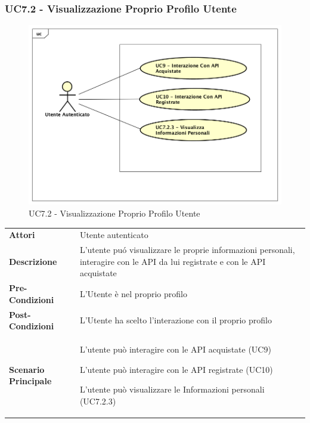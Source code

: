 \newpage
\subsubsection{UC7.2 - Visualizzazione Proprio Profilo Utente}
\label{UC7.2}

\begin{figure}[ht]
	\centering
	\includegraphics[scale=0.45]{UML/UC7_2.png}
	\caption{UC7.2 - Visualizzazione Proprio Profilo Utente}
\end{figure}
\FloatBarrier
\begin{longtable}{ l | p{11cm}}
	\hline
	\rowcolor{Gray}
	 \multicolumn{2}{c}{UC7.2 - Visualizzazione Proprio Profilo Utente} \\
	 \hline
	 \textbf{Attori} & Utente autenticato \\
	\textbf{Descrizione} & L’utente pu\'{o} visualizzare le proprie informazioni personali, interagire con le API da lui registrate e con le API acquistate  \\
	\textbf{Pre-Condizioni} & L’Utente \`{e} nel proprio profilo \\
	\textbf{Post-Condizioni} & L’Utente ha scelto l'interazione con il proprio profilo \\
	\textbf{Scenario Principale} & 
	\begin{enumerate*}[label=(\arabic*.),itemjoin={\newline}]
		\item L'utente pu\`{o} interagire con le API acquistate (UC9)
		\item L'utente pu\`{o} interagire con le API registrate (UC10)
		\item L'utente pu\`{o} visualizzare le Informazioni personali (UC7.2.3)
	\end{enumerate*}\\
\end{longtable}


